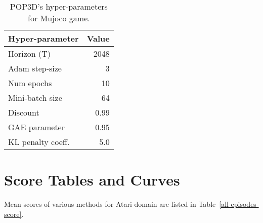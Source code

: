 \documentclass{article}
\begin{document}
\begin{table}
	\begin{center}
		\begin{tabular}{lr}
			\toprule
			Hyper-parameter & Value \\
			\midrule
			Horizon (T)    &2048 \\
			Adam step-size &3 \\
			Num epochs    & 10 \\
			Mini-batch size    & 64\\
			Discount      & 0.99\\
			GAE parameter       & 0.95 \\
			KL penalty coeff. &5.0 \\
			\bottomrule
		\end{tabular}
		\caption{POP3D's hyper-parameters for Mujoco game.}
		\label{POP3D-Mujoco-game-hyperparameter}
	\end{center}
\end{table}	

\section{Score Tables and Curves}
Mean scores of various methods for Atari domain are listed in Table~\ref{all-episodes-score}.
\end{document}
